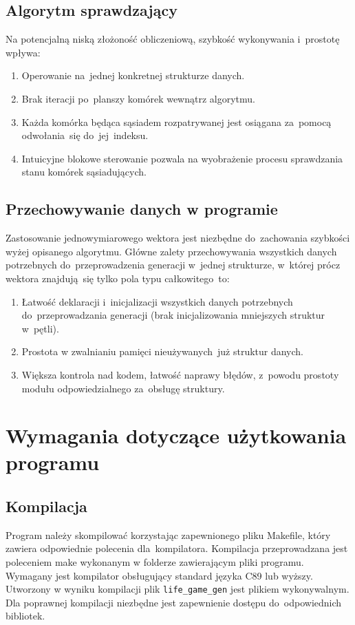 \documentclass[a4paper,11pt]{article}
\begin{document}
    		\subsection{Algorytm sprawdzający}
    			Na potencjalną niską złożoność obliczeniową, szybkość wykonywania i~prostotę wpływa: 
    				\begin{enumerate}
    					\item Operowanie na~jednej konkretnej strukturze danych.
    					\item Brak iteracji po~planszy komórek wewnątrz algorytmu.
    					\item Każda komórka będąca sąsiadem rozpatrywanej jest osiągana za~pomocą odwołania~się do~jej~indeksu.
    					\item Intuicyjne blokowe sterowanie pozwala na wyobrażenie procesu sprawdzania stanu komórek sąsiadujących.
    				\end{enumerate}
    		\subsection{Przechowywanie danych w programie}
    			Zastosowanie jednowymiarowego wektora jest niezbędne do~zachowania szybkości wyżej opisanego algorytmu. Główne zalety przechowywania wszystkich danych potrzebnych do~przeprowadzenia generacji w~jednej strukturze, w~której prócz wektora znajdują~się tylko pola typu całkowitego~to:
    				\begin{enumerate}
    					\item Łatwość deklaracji i~inicjalizacji wszystkich danych potrzebnych do~przeprowadzania generacji (brak inicjalizowania mniejszych struktur w~pętli).
    					\item Prostota w zwalnianiu pamięci nieużywanych~już struktur danych.
    					\item Większa kontrola nad kodem, łatwość naprawy błędów, z~powodu prostoty modułu odpowiedzialnego za~obsługę struktury.
    				\end{enumerate} 	
		 		
	
	\section{Wymagania dotyczące użytkowania programu}
	  \subsection{Kompilacja}
	  Program należy skompilować korzystając zapewnionego pliku Makefile, który zawiera odpowiednie polecenia dla~kompilatora. Kompilacja przeprowadzana jest poleceniem make wykonanym w folderze zawierającym pliki programu. Wymagany jest kompilator obsługujący standard języka C89 lub wyższy. Utworzony w wyniku kompilacji plik \texttt{life\_game\_gen} jest plikiem wykonywalnym. Dla poprawnej kompilacji niezbędne jest zapewnienie dostępu do~odpowiednich bibliotek.
\end{document}
